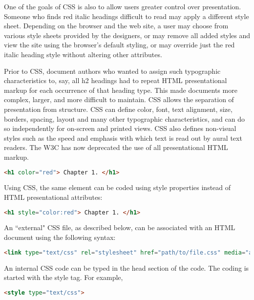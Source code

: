 
One of the goals of CSS is also to allow users greater control over presentation. Someone who finds red italic headings difficult to read may apply a different style sheet. Depending on the browser and the web site, a user may choose from various style sheets provided by the designers, or may remove all added styles and view the site using the browser's default styling, or may override just the red italic heading style without altering other attributes.


Prior to CSS, document authors who wanted to assign such typographic characteristics to, say, all h2 headings had to repeat HTML presentational markup for each occurrence of that heading type. This made documents more complex, larger, and more difficult to maintain. CSS allows the separation of presentation from structure. CSS can define color, font, text alignment, size, borders, spacing, layout and many other typographic characteristics, and can do so independently for on-screen and printed views. CSS also defines non-visual styles such as the speed and emphasis with which text is read out by aural text readers. The W3C has now deprecated the use of all presentational HTML markup.


\begin{lstlisting}[language=HTML]
<h1 color="red"> Chapter 1. </h1>
\end{lstlisting}


Using CSS, the same element can be coded using style properties instead of HTML presentational attributes:


\begin{lstlisting}[language=HTML]
<h1 style="color:red"> Chapter 1. </h1>
\end{lstlisting}

An ``external" CSS file, as described below, can be associated with an HTML document using the following syntax:


\begin{lstlisting}[language=HTML]
<link type="text/css" rel="stylesheet" href="path/to/file.css" media="all">
\end{lstlisting}


An internal CSS code can be typed in the head section of the code. The coding is started with the style tag. For example,


\begin{lstlisting}[language=HTML]
<style type="text/css">
\end{lstlisting}





